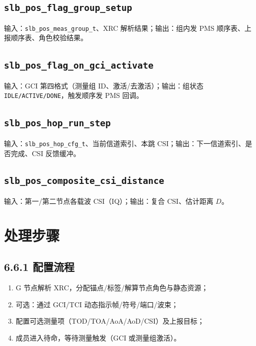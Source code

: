 \documentclass[11pt,a4paper]{ctexart}
\begin{document}
\subsection{\texttt{slb\_pos\_flag\_group\_setup}}

输入：\texttt{slb\_pos\_meas\_group\_t}、XRC 解析结果；输出：组内发 PMS 顺序表、上报顺序表、角色校验结果。

\subsection{\texttt{slb\_pos\_flag\_on\_gci\_activate}}

输入：GCI 第四格式（测量组 ID、激活/去激活）；输出：组状态 \texttt{IDLE/ACTIVE/DONE}，触发顺序发 PMS 回调。

\subsection{\texttt{slb\_pos\_hop\_run\_step}}

输入：\texttt{slb\_pos\_hop\_cfg\_t}、当前信道索引、本跳 CSI；输出：下一信道索引、是否完成、CSI 反馈缓冲。

\subsection{\texttt{slb\_pos\_composite\_csi\_distance}}

输入：第一/第二节点各载波 CSI（IQ）；输出：复合 CSI、估计距离 $D$。

\section{处理步骤}

\subsection{6.6.1 配置流程}

\begin{enumerate}
  \item G 节点解析 XRC，分配锚点/标签/解算节点角色与静态资源；
  \item 可选：通过 GCI/TCI 动态指示帧/符号/端口/波束；
  \item 配置可选测量项（TOD/TOA/AoA/AoD/CSI）及上报目标；
  \item 成员进入待命，等待测量触发（GCI 或测量组激活）。
\end{enumerate}
\end{document}
